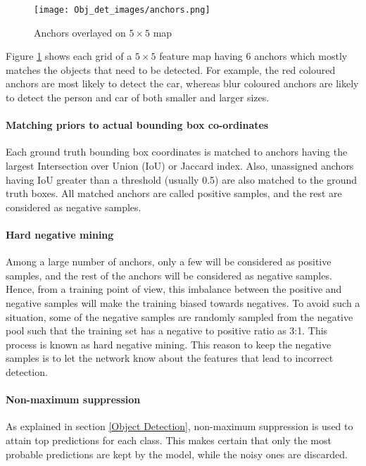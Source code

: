 \begin{figure}[h!]
    \centering
    \texttt{[image: Obj\_det\_images/anchors.png]}
    \caption{Anchors overlayed on $5\times5$ map \cite{AI-Dairy}}
    \label{Anchors}
\end{figure}

Figure \ref{Anchors} shows each grid of a $5\times5$ feature map having 6 anchors which mostly matches the objects that need to be detected. For example, the red coloured anchors are most likely to detect the car, whereas blur coloured anchors are likely to detect the person and car of both smaller and larger sizes. 


\paragraph{Matching priors to actual bounding box co-ordinates}

Each ground truth bounding box coordinates is matched to anchors having the largest Intersection over Union (IoU) or Jaccard index. Also, unassigned anchors having IoU greater than a threshold (usually 0.5) are also matched to the ground truth boxes. All matched anchors are called positive samples, and the rest are considered as negative samples. 

\paragraph{Hard negative mining}

Among a large number of anchors, only a few will be considered as positive samples, and the rest of the anchors will be considered as negative samples. Hence, from a training point of view, this imbalance between the positive and negative samples will make the training biased towards negatives. To avoid such a situation, some of the negative samples are randomly sampled from the negative pool such that the training set has a negative to positive ratio as 3:1. This process is known as hard negative mining. This reason to keep the negative samples is to let the network know about the features that lead to incorrect detection. 

\paragraph{Non-maximum suppression}

As explained in section \ref{Object Detection}, non-maximum suppression is used to attain top predictions for each class. This makes certain that only the most probable predictions are kept by the model, while the noisy ones are discarded. 
\par

